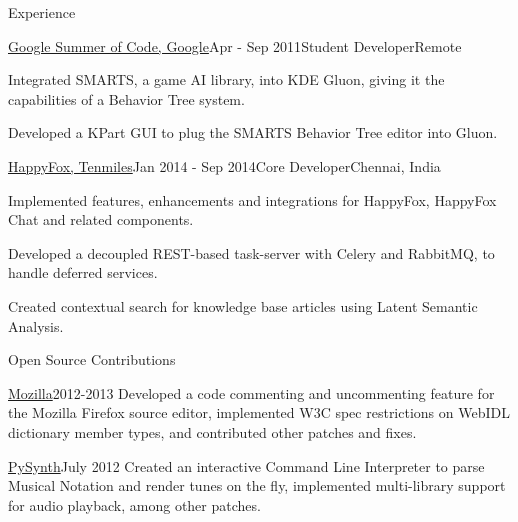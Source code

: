 \documentclass{resume} %
\begin{document}
\begin{rSection}{Experience}

    \begin{rSubsection}{\href{https://www.google-melange.com/gsoc/project/details/google/gsoc2011/pranavrc/5757334940811264}{Google Summer of Code, Google}}{Apr - Sep 2011}{Student Developer}{Remote}
\item Integrated SMARTS, a game AI library, into KDE Gluon, giving it the capabilities of a Behavior Tree system.
\item Developed a KPart GUI to plug the SMARTS Behavior Tree editor into Gluon.
\end{rSubsection}


\begin{rSubsection}{\href{https://happyfox.com/}{HappyFox, Tenmiles}}{Jan 2014 - Sep 2014}{Core Developer}{Chennai, India}
\item Implemented features, enhancements and integrations for HappyFox, HappyFox Chat and related components.
\item Developed a decoupled REST-based task-server with Celery and RabbitMQ, to handle deferred services.
\item Created contextual search for knowledge base articles using Latent Semantic Analysis.
\end{rSubsection}


\end{rSection}


\begin{rSection}{Open Source Contributions}

\begin{rSubsection}{\href{https://bugzilla.mozilla.org/user\%5Fprofile?user\%5Fid=431664}{Mozilla}}{2012-2013}{}{}
Developed a code commenting and uncommenting feature for the Mozilla Firefox source editor, implemented W3C spec restrictions on WebIDL dictionary member types, and contributed other patches and fixes.
\end{rSubsection}

\begin{rSubsection}{\href{https://github.com/mdoege/PySynth/commits?author=pranavrc}{PySynth}}{July 2012}{}{}
Created an interactive Command Line Interpreter to parse Musical Notation and render tunes on the fly, implemented multi-library support for audio playback, among other patches.
\end{rSubsection}

\end{rSection}
\end{document}
